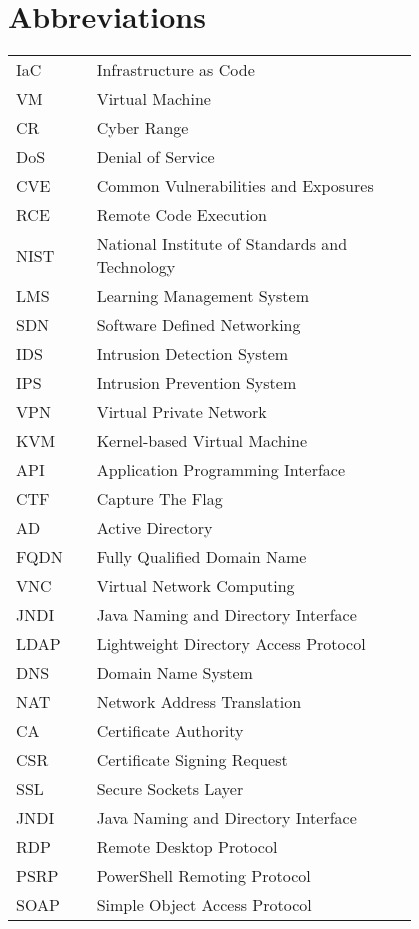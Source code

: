 \chapter*{Abbreviations}

\begin{flushleft}
\begin{tabular}{l p{0.8\linewidth}}
IaC      & Infrastructure as Code\\
VM       & Virtual Machine\\
CR       & Cyber Range\\
DoS      & Denial of Service\\
CVE      & Common Vulnerabilities and Exposures\\
RCE      & Remote Code Execution\\
NIST     & National Institute of Standards and Technology\\
LMS      & Learning Management System\\
SDN      & Software Defined Networking\\
IDS      & Intrusion Detection System\\
IPS      & Intrusion Prevention System\\
VPN      & Virtual Private Network\\
KVM      & Kernel-based Virtual Machine\\
API      & Application Programming Interface\\
CTF      & Capture The Flag\\
AD       & Active Directory\\
FQDN     & Fully Qualified Domain Name\\
VNC      & Virtual Network Computing\\
JNDI     & Java Naming and Directory Interface\\
LDAP     & Lightweight Directory Access Protocol\\
DNS      & Domain Name System\\
NAT      & Network Address Translation\\
CA       & Certificate Authority\\
CSR      & Certificate Signing Request\\
SSL      & Secure Sockets Layer\\
JNDI     & Java Naming and Directory Interface\\
RDP      & Remote Desktop Protocol\\
PSRP     & PowerShell Remoting Protocol\\
SOAP     & Simple Object Access Protocol\\

\end{tabular}
\end{flushleft}

